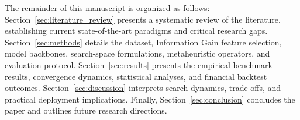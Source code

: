 The remainder of this manuscript is organized as follows: Section~\ref{sec:literature_review} presents a systematic review of the literature, establishing current state-of-the-art paradigms and critical research gaps. Section~\ref{sec:methods} details the dataset, Information Gain feature selection, model backbones, search-space formulations, metaheuristic operators, and evaluation protocol. Section~\ref{sec:results} presents the empirical benchmark results, convergence dynamics, statistical analyses, and financial backtest outcomes. Section~\ref{sec:discussion} interprets search dynamics, trade-offs, and practical deployment implications. Finally, Section~\ref{sec:conclusion} concludes the paper and outlines future research directions.
